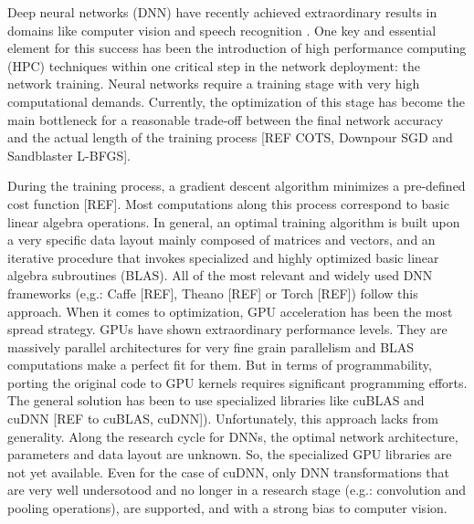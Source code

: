 Deep neural networks (DNN) have recently achieved extraordinary 
results in domains like computer vision and speech recognition \cite{ILSVRC15, Hannun2014}. 
One key and essential element for this success
has been the introduction of high performance computing (HPC)
techniques within one critical step in the network deployment: the
network training. Neural networks require a training stage with
very high computational demands. Currently, the optimization of this stage
has become the main bottleneck for a reasonable trade-off between the
final network accuracy and the actual length of the
training process [REF COTS, Downpour SGD and Sandblaster 
L-BFGS]. 

During the training process, a gradient descent algorithm minimizes a pre-defined cost function [REF]. Most computations
along this process correspond to basic linear algebra operations. In
general, an optimal training algorithm is built upon a very specific 
data layout mainly composed of matrices and vectors, and an iterative
procedure that invokes specialized and highly optimized basic
linear algebra subroutines (BLAS). All of the most relevant and
widely used DNN frameworks (e,g.: Caffe [REF], Theano [REF]
or Torch [REF]) follow this approach. When it comes to optimization, 
GPU acceleration has been the most spread strategy. GPUs have
shown extraordinary performance levels. They are massively
parallel architectures for very fine grain parallelism and BLAS
computations make a perfect fit for them. But in terms of programmability,
porting the original code to GPU kernels requires significant programming 
efforts. The general solution has been to use specialized 
libraries like cuBLAS and cuDNN [REF to cuBLAS,
cuDNN]). Unfortunately, this approach lacks from generality.
Along the research cycle for DNNs, the optimal network architecture,
parameters and data layout are unknown. So, the specialized
GPU libraries are not yet available. Even for the case of cuDNN,
only DNN transformations that are very well undersotood and no 
longer in a research stage (e.g.: convolution and pooling operations),
are supported, and with a strong bias to computer vision.

